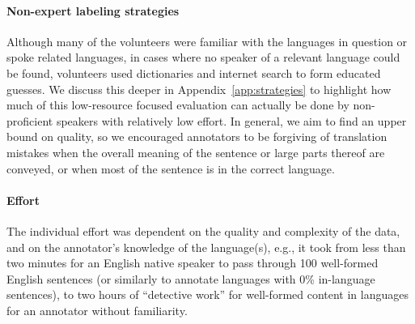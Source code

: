 \paragraph{Non-expert labeling strategies}
Although many of the volunteers were familiar with the languages in question or spoke related languages, in cases where no speaker of a relevant language could be found, volunteers used dictionaries and internet search to form educated guesses. We discuss this deeper in Appendix~\ref{app:strategies} to highlight how much of this low-resource focused evaluation can actually be done by non-proficient speakers with relatively low effort.
In general, we aim to find an upper bound on quality, so we encouraged annotators to be forgiving of translation mistakes when the overall meaning of the sentence or large parts thereof are conveyed, or when most of the sentence is in the correct language.

\paragraph{Effort} The individual effort was dependent on the quality and complexity of the data, and on the annotator's knowledge of the language(s), e.g., it took from less than two minutes for an English native speaker to pass through 100 well-formed English sentences (or similarly to annotate languages with 0\% in-language sentences), to two hours of ``detective work'' for well-formed content in languages for an annotator without familiarity.


